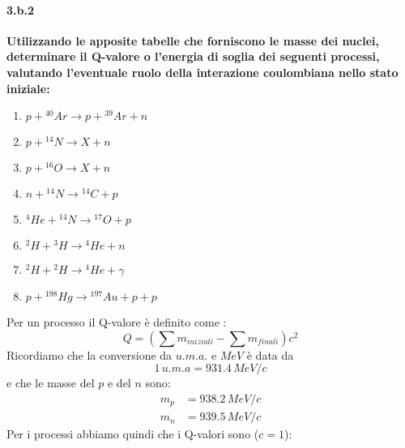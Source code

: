 \documentclass[twoside]{article}
\begin{document}
\paragraph{3.b.2}\textbf{Utilizzando le apposite tabelle che forniscono le masse dei nuclei, determinare il Q-valore o l'energia di soglia dei seguenti processi, valutando l'eventuale ruolo della interazione coulombiana nello stato iniziale:}
\begin{enumerate}
    \item $p+{}^{40}Ar\longrightarrow p+{}^{39}Ar+n$
    \item $p+{}^{14}N\longrightarrow X+n$
    \item $p+{}^{16}O\longrightarrow X+n$
    \item $n+{}^{14}N\longrightarrow {}^{14}C+p$
    \item ${}^4He+{}^{14}N\longrightarrow {}^{17}O+p$
    \item ${}^2H+{}^3H\longrightarrow {}^4He+n$
    \item ${}^2H+{}^2H\longrightarrow {}^4He+\gamma$
    \item $p+{}^{198}Hg\longrightarrow {}^{197}Au+p+p$
\end{enumerate}
Per un processo il Q-valore è definito come :
\begin{equation}
    Q=(\sum m_{iniziali}-\sum m_{finali})c^2
\end{equation}
Ricordiamo che la conversione da $u.m.a.$ e $MeV$ è data da 
\begin{equation}
    1\,u.m.a=931.4\,MeV/c
\end{equation}
e che le masse del $p$ e del $n$ sono:
\begin{align}
    m_p&=938.2\,MeV/c\\
    m_n&=939.5\,MeV/c
\end{align}
Per i processi abbiamo quindi che i Q-valori sono ($c=1$):
\end{document}
